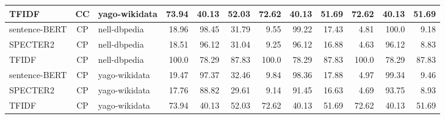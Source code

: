 \begin{table}[h]
\begin{tabular}{|l|c|l|r|r|r|r|r|r|r|r|r|}
	TFIDF  & CC & yago-wikidata  & 73.94 & 40.13 & 52.03 & 72.62 & 40.13 & 51.69 & 72.62 & 40.13 & 51.69\\
	\hline
	sentence-BERT  & CP & nell-dbpedia  & 18.96 & 98.45 & 31.79 & 9.55 & 99.22 & 17.43 & 4.81 & 100.0 & 9.18\\
	SPECTER2  & CP & nell-dbpedia  & 18.51 & 96.12 & 31.04 & 9.25 & 96.12 & 16.88 & 4.63 & 96.12 & 8.83\\
	TFIDF  & CP & nell-dbpedia  & 100.0 & 78.29 & 87.83 & 100.0 & 78.29 & 87.83 & 100.0 & 78.29 & 87.83\\
	\hline
	sentence-BERT  & CP & yago-wikidata  & 19.47 & 97.37 & 32.46 & 9.84 & 98.36 & 17.88 & 4.97 & 99.34 & 9.46\\
	SPECTER2  & CP & yago-wikidata  & 17.76 & 88.82 & 29.61 & 9.14 & 91.45 & 16.63 & 4.69 & 93.75 & 8.93\\
	TFIDF  & CP & yago-wikidata  & 73.94 & 40.13 & 52.03 & 72.62 & 40.13 & 51.69 & 72.62 & 40.13 & 51.69\\
	\hline
    \end{tabular}
\end{table}
